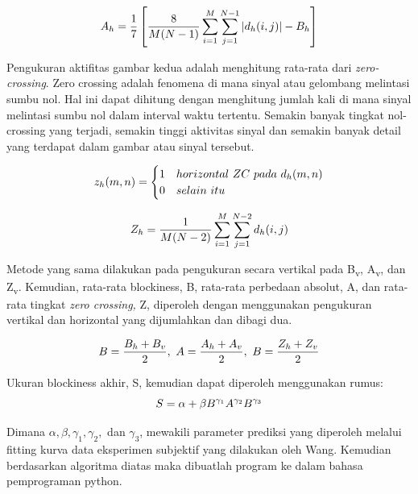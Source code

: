 \begin{equation} 
	\label{eq3-5}
	A_h=\frac{1}{7}\left[\frac{8}{M(N-1)}\sum_{i=1}^{M}\sum_{j=1}^{N-1}\left| d_h(i,j) \right|-B_h\right]
	\vspace{0.5cm}
\end{equation}

Pengukuran aktifitas gambar kedua adalah menghitung rata-rata dari \textit{zero-crossing}. Zero crossing adalah fenomena di mana sinyal atau gelombang melintasi sumbu nol. Hal ini dapat dihitung dengan menghitung jumlah kali di mana sinyal melintasi sumbu nol dalam interval waktu tertentu. Semakin banyak tingkat nol-crossing yang terjadi, semakin tinggi aktivitas sinyal dan semakin banyak detail yang terdapat dalam gambar atau sinyal tersebut. 

\begin{equation} 
	\label{eq3-6}
	z_h(m,n)=\begin{cases}1 & horizontal \ ZC \ pada \ d_h(m,n) \\0 & selain \ itu\end{cases}
	\vspace{0.5cm}
\end{equation}

\begin{equation} 
	\label{eq3-7}
	Z_h=\frac{1}{M(N-2)}\sum_{i=1}^{M}\sum_{j=1}^{N-2} d_h(i,j)
	\vspace{0.5cm}
\end{equation}

Metode yang sama dilakukan pada pengukuran secara vertikal pada B\textsubscript{v}, A\textsubscript{v}, dan Z\textsubscript{v}. Kemudian, rata-rata blockiness, B, rata-rata perbedaan absolut, A, dan rata-rata tingkat \textit{zero crossing,} Z, diperoleh dengan menggunakan pengukuran vertikal dan horizontal yang dijumlahkan dan dibagi dua.

\begin{equation} 
	\label{eq3-8}
	B=\frac{B_h+B_v}{2}, \ A=\frac{A_h+A_v}{2}, \ B=\frac{Z_h+Z_v}{2}
	\vspace{0.5cm}
\end{equation}


Ukuran blockiness akhir, S, kemudian dapat diperoleh menggunakan rumus:
\begin{equation} 
	\label{eq3-9}
	S=\alpha+\beta B^{\gamma_1}A^{\gamma_2}B^{\gamma_3}
	\vspace{0.5cm}
\end{equation}

Dimana  $\alpha, \beta,{\gamma _1}, {\gamma _2}, $ dan $ {\gamma _3}$, mewakili parameter prediksi yang diperoleh melalui fitting kurva data eksperimen subjektif  yang dilakukan oleh Wang. Kemudian berdasarkan algoritma diatas maka dibuatlah program ke dalam bahasa pemprograman python.

